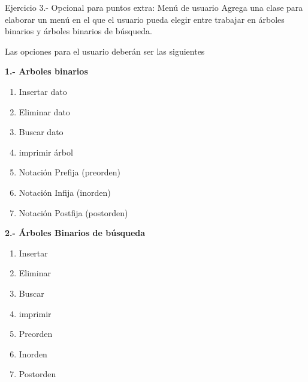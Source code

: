 \begin{ejercicio}{Ejercicio 3.- Opcional para puntos extra: Menú de usuario}
    Agrega una clase para elaborar un menú en el que el usuario pueda elegir entre trabajar en árboles binarios y árboles binarios de búsqueda.

    Las opciones para el usuario deberán ser las siguientes
    \begin{center}
        \begin{minipage}[t]{0.45\textwidth}
            \textbf{1.- Arboles binarios}
            \begin{enumerate}
                \item Insertar dato
                \item Eliminar dato
                \item Buscar dato
                \item imprimir árbol
                \item Notación Prefija (preorden)
                \item Notación Infija (inorden)
                \item Notación Postfija (postorden)
            \end{enumerate}
        \end{minipage}
        \hfill %
        \begin{minipage}[t]{0.45\textwidth}
            \textbf{2.- Árboles Binarios de búsqueda}
            \begin{enumerate}
                \item Insertar
                \item Eliminar
                \item Buscar
                \item imprimir 
                \item Preorden
                \item Inorden
                \item Postorden
            \end{enumerate}
        \end{minipage}
    \end{center}
\end{ejercicio}

